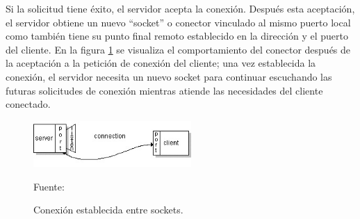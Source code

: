 Si la solicitud tiene éxito, el servidor acepta la conexión. Después esta aceptación, el servidor obtiene un nuevo ``socket'' o conector vinculado al mismo puerto local como también tiene su punto final remoto establecido en la dirección y el puerto del cliente. En la figura \ref{fig:socket_connection} se visualiza el comportamiento del conector después de la aceptación a la petición de conexión del cliente; una vez establecida la conexión, el servidor necesita un nuevo socket para continuar escuchando las futuras solicitudes de conexión mientras atiende las necesidades del cliente conectado.\\

\begin{figure}[H]
    \begin{center}
        \includegraphics[width=6cm]{img/capitulo_2/socket_connection.jpg}
    \end{center}
    \begin{center}
        \caption{Conexión establecida entre sockets.}
        Fuente: \cite{socketconnection}
        \label{fig:socket_connection}
    \end{center}
\end{figure}



